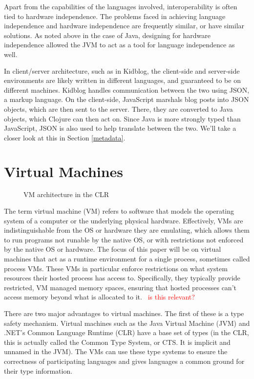 \documentclass{sig-alternate}
\newcommand{\mycomment}[1]{\textcolor{red}{#1}}
\begin{document}
Apart from the capabilities of the languages involved, interoperability is often tied to hardware independence. The problems faced in achieving language independence and hardware independence are frequently similar, or have similar solutions. As noted above in the case of Java, designing for hardware independence allowed the JVM to act as a tool for language independence as well.

In client/server architecture, such as in Kidblog, the client-side and server-side environments are likely written in different languages, and guaranteed to be on different machines. Kidblog handles communication between the two using JSON, a markup language. On the client-side, JavaScript marshals blog posts into JSON objects, which are then sent to the server. There, they are converted to Java objects, which Clojure can then act on. Since Java is more strongly typed than JavaScript, JSON is also used to help translate between the two. We'll take a closer look at this in Section \ref{metadata}.


\section{Virtual Machines}\label{VM}
\begin{figure}
\caption{VM architecture in the CLR~\cite{wiki:CLR}}
\label{VMmodel}
\end{figure}

The term virtual machine (VM) refers to software that models the operating system of a computer or the underlying physical hardware. Effectively, VMs are indistinguishable from the OS or hardware they are emulating, which allows them to run programs not runable by the native OS, or with restrictions not enforced by the native OS or hardware.
The focus of this paper will be on virtual machines that act as a runtime environment for a single process, sometimes called process VMs. These VMs in particular enforce restrictions on what system resources their hosted process has access to. Specifically, they typically provide restricted, VM managed memory spaces, ensuring that hosted processes can't access memory beyond what is allocated to it.~\cite{wiki:VM} \mycomment{is this relevant?}

There are two major advantages to virtual machines. The first of these is a type safety mechanism. Virtual machines such as the Java Virtual Machine (JVM) and .NET's Common Language Runtime (CLR) have a base set of types (in the CLR, this is actually called the Common Type System, or CTS. It is implicit and unnamed in the JVM). The VMs can use these type systems to ensure the correctness of participating languages and gives languages a common ground for their type information.
\end{document}
